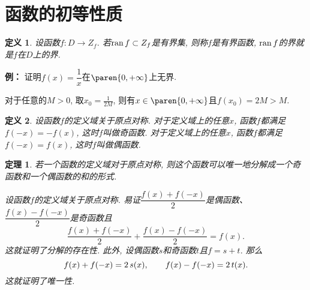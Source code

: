 \documentclass[a4paper,punct=CCT]{ctexbook}
\makeatletter
\theoremstyle{break}
\newtheorem*{theorem*}{定理}
\newtheorem*{definition*}{定义}
\renewenvironment{proof}[1][\proofname]{\par
  \pushQED{\qed}%
  \normalfont \topsep6\p@\@plus6\p@\relax
  \trivlist
  \item[]\ignorespaces
}{%
  \popQED\endtrivlist\@endpefalse
}
\newenvironment{example}[1][]{\noindent\textbf{例#1：}}{}
\makeatother
\begin{document}
\section{函数的初等性质}

\begin{definition*}
  设函数\(f\colon D \to Z_f\).  若\(\operatorname{ran} f \subset Z_f\)是有界集, 则称\(f\)是有界函数, \(\operatorname{ran} f\)的界就是\(f\)在\(D\)上的界.
\end{definition*}

\begin{example}
  证明\(f(x) = \dfrac1x\)在\(\paren{0,+\infty}\)上无界.

  \begin{proof}
    对于任意的\(M > 0\), 取\(x_0 = \frac1{2M}\), 则有\(x \in \paren{0,+\infty}\)且\(f(x_0) = 2M > M\).
  \end{proof}
\end{example}

\begin{definition*}
  设函数\(f\)的定义域关于原点对称.  对于定义域上的任意\(x\), 函数\(f\)都满足\(f(-x) = -f(x)\), 这时\(f\)叫做奇函数.  对于定义域上的任意\(x\), 函数\(f\)都满足\(f(-x) = f(x)\), 这时\(f\)叫做偶函数.
\end{definition*}

\hypertarget{T:evenodd}{}
\begin{theorem*}
  若一个函数的定义域对于原点对称, 则这个函数可以唯一地分解成一个奇函数和一个偶函数的和的形式.

  \begin{proof}
    设函数\(f\)的定义域关于原点对称.  易证\(\dfrac{f(x)+f(-x)}{2}\)是偶函数、\(\dfrac{f(x)-f(-x)}{2}\)是奇函数且
    \[
      \frac{f(x)+f(-x)}{2} + \frac{f(x)-f(-x)}{2} = f(x).
    \]
    这就证明了分解的存在性.  此外, 设偶函数\(s\)和奇函数\(t\)且\(f = s + t\).  那么
    \[
      f(x) + f(-x) = 2\mathop{\relax\kern0pt s}\nolimits(x),
      \qquad
      f(x) - f(-x) = 2\mathop{\relax\kern0pt t}\nolimits(x).
    \]
    这就证明了唯一性.
  \end{proof}
\end{theorem*}
\end{document}
